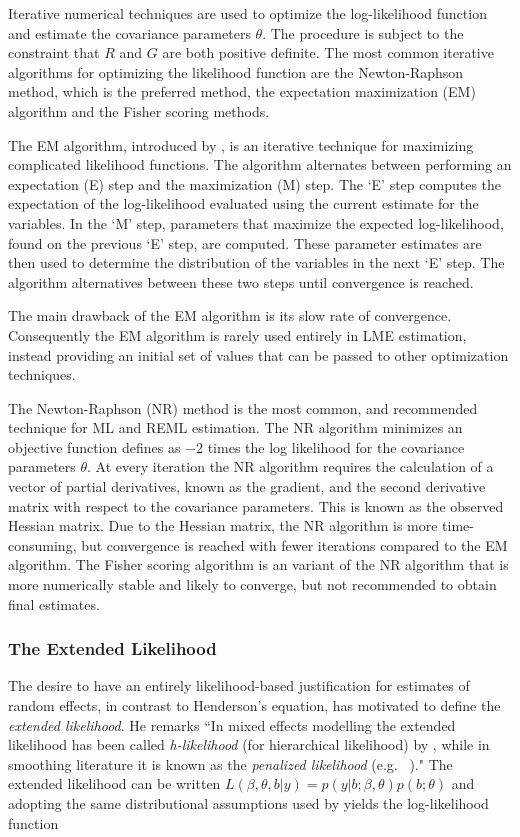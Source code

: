 \documentclass[12pt, a4paper]{report}
\theoremstyle{definition}
\theoremstyle{remark}
\begin{document}
Iterative numerical techniques are used to optimize the log-likelihood function and estimate the covariance parameters $\theta$. The procedure is subject to the constraint that $R$ and $G$ are both positive definite. The most common iterative algorithms for optimizing the likelihood function are the Newton-Raphson method, which is the preferred method, the expectation maximization (EM) algorithm and the Fisher scoring methods.

The EM algorithm, introduced by \citet{EM}, is an iterative technique for maximizing complicated likelihood functions. The algorithm alternates between performing an expectation (E) step and the maximization (M) step. The `E' step computes the expectation of the log-likelihood evaluated using the current estimate for the variables. In the `M' step, parameters that maximize the expected log-likelihood, found on the previous `E' step, are computed. These parameter estimates are then used to determine the distribution of the variables in the next `E' step. The algorithm alternatives between these two steps until convergence is reached.

The main drawback of the EM algorithm is its slow rate of convergence. Consequently the EM algorithm is rarely used entirely in LME estimation, instead providing an initial set of values that can be passed to other optimization techniques.

The Newton-Raphson (NR) method is the most common, and recommended technique for ML and REML estimation. The NR algorithm minimizes an objective function defines as $-2$ times the log likelihood for the covariance parameters $\theta$. At every iteration the NR algorithm requires the calculation of a vector of partial derivatives, known as the gradient, and the second derivative matrix with respect to the covariance parameters. This is known as the observed Hessian matrix. Due to the Hessian matrix, the NR algorithm is more time-consuming, but convergence is reached with fewer iterations compared to the EM algorithm. The Fisher scoring algorithm is an variant of the NR algorithm that is more numerically stable and likely to converge, but not recommended to obtain final estimates.

\subsubsection{The Extended Likelihood}

The desire to have an entirely likelihood-based justification for estimates of random effects, in contrast to Henderson's equation, has motivated \citet[page 429]{Pawi:in:2001} to define the \emph{extended likelihood}. He remarks ``In mixed effects modelling the extended likelihood has been called \emph{h-likelihood} (for hierarchical  likelihood) by \cite{Lee:Neld:hier:1996}, while in smoothing literature it is known as the \emph{penalized likelihood} (e.g.\ \citeauthor{Gree:Silv:nonp:1994} \citeyear{Gree:Silv:nonp:1994})." The extended likelihood can be written $L(\beta,\theta,b|y) = p(y|b;\beta,\theta) p(b;\theta)$ and adopting the same distributional assumptions used by \cite{Henderson:1950} yields the log-likelihood function
\end{document}
